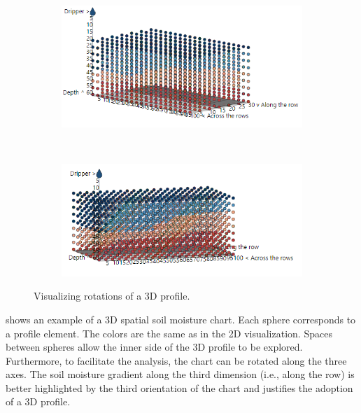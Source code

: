 \begin{figure}[t]
\centering
\begin{subfigure}[t]{.45\textwidth}
\centering
\includegraphics[scale=.4]{chapters/physics-aware/pluto/img/3d-visualization-a.png}
\end{subfigure}
~
\begin{subfigure}[t]{.45\textwidth}
\centering
\includegraphics[scale=.45]{chapters/physics-aware/pluto/img/3d-visualization-b.png}
\end{subfigure}
\caption{Visualizing rotations of a 3D profile.}
\label{pluto-fig:3D-visualization}
\end{figure}

 shows an example of a 3D spatial soil moisture chart.
Each sphere corresponds to a profile element. The colors are the same as in the 2D visualization.
Spaces between spheres allow the inner side of the 3D profile to be explored. Furthermore, to facilitate the analysis, the chart can be rotated along the three axes. 
The soil moisture gradient along the third dimension (i.e., along the row) is better highlighted by the third orientation of the chart and justifies the adoption of a 3D profile.

